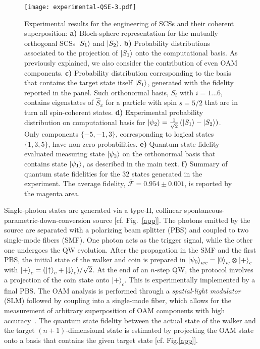 \begin{figure*}[t]
\texttt{[image: experimental-QSE-3.pdf]}
\caption{Experimental results for the engineering of SCSs and their coherent superposition: {\bf a)} Bloch-sphere representation for the mutually orthogonal SCSs $\ket{S_1}$ and $\ket{S_2}$.
{\bf b)} Probability distributions associated to the projection of $\ket{S_1}$ onto the computational basis. As previously explained, we also consider the contribution of even OAM components.
{\bf c)} Probability distribution corresponding to the basis that contains the target state itself $\ket{S_1}$, generated with the fidelity reported in the panel. Such orthonormal basis, {$S_i$} with $i= 1 ...6$, contains eigenstates of $\hat{S}_x$ for a particle with spin $s=5/2$ that are in turn all spin-coherent states.
{\bf d)} Experimental probability distribution on computational basis for $\ket{\psi_2}=\frac{1}{\sqrt{2}}\left (\ket{S_1}- \ket{S_2} \right)$. Only components $\{-5, -1, 3\}$, corresponding to logical states $\{1,3,5\}$, have non-zero probabilities.
{\bf e)} Quantum state fidelity evaluated measuring state $\ket{\psi_2}$ on the orthonormal basis that contains state $\ket{\psi_1}$, as described in the main text. 
{\bf f)} Summary of quantum state fidelities for the $32$ states generated in the experiment. The average fidelity, $\bar{\mathcal{F}}=0.954\pm 0.001$, is reported by the magenta area. 
}
\label{figSpin}
\end{figure*}

Single-photon states are generated via a type-II, collinear spontaneous-parametric-down-conversion source [cf. Fig.~\ref{app}]. 
The photons emitted by the source are separated with a polarizing beam splitter (PBS) and coupled to two single-mode fibers (SMF). One photon acts as the trigger signal, while the other one undergoes the \ac{QW} evolution. After the propagation in the SMF and the first PBS, the initial state of the walker and coin is prepared in $\ket{\psi_0}_{wc}=\ket{0}_w \otimes \ket{+}_c$ with $\ket{+}_c=(\ket{{\uparrow}}_c+\ket{{\downarrow}}_c)/\sqrt2$. At the end of an $n$-step \ac{QW}, the protocol involves a projection of the coin state onto $|+\rangle_c$. This is experimentally implemented by a final PBS. The OAM analysis is performed through a \emph{spatial-light modulator} (SLM) followed by coupling into a single-mode fiber, which allows for the measurement of arbitrary superposition of OAM components with high accuracy~\cite{bolduc2013exact,dambrosio2013test}. The quantum state fidelity between the actual state of the walker and the target $(n+1)$-dimensional state is estimated by projecting the OAM state onto a basis that contains the given target state [cf. Fig.\ref{app}]. 

